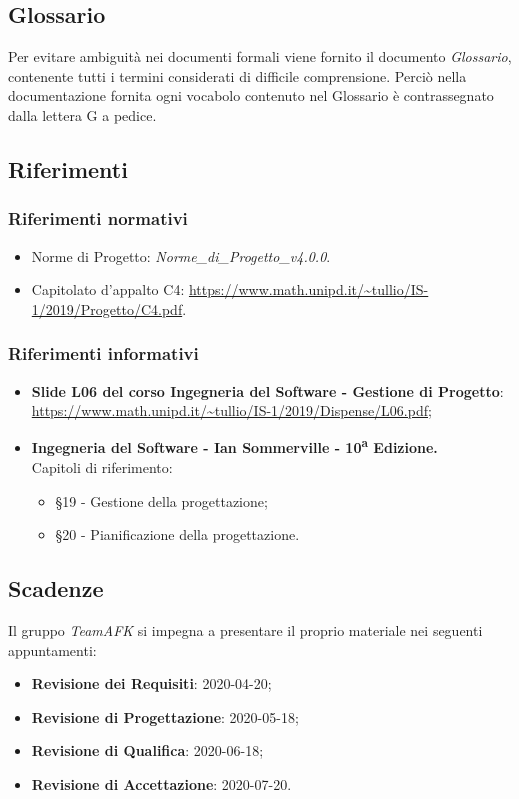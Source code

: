 \subsection{Glossario}
Per evitare ambiguità nei documenti formali viene fornito il documento \textit{Glossario}, contenente tutti i termini considerati di difficile comprensione. Perciò nella documentazione fornita ogni vocabolo contenuto nel Glossario è contrassegnato dalla lettera G a pedice.

\subsection{Riferimenti}
\subsubsection{Riferimenti normativi}
\begin{itemize}
	\item Norme di Progetto: \textit{Norme\_di\_Progetto\_v4.0.0}.
	\item Capitolato d'appalto C4: \url{https://www.math.unipd.it/~tullio/IS-1/2019/Progetto/C4.pdf}.
\end{itemize}
\subsubsection{Riferimenti informativi}
\begin{itemize}
	\item \textbf{Slide L06 del corso Ingegneria del Software - Gestione di Progetto}: \\
	\url{https://www.math.unipd.it/~tullio/IS-1/2019/Dispense/L06.pdf};
	\item \textbf{Ingegneria del Software - Ian Sommerville - 10\textsuperscript{a} Edizione.}\\
	Capitoli di riferimento: \begin{itemize}
	\item \S 19 - Gestione della progettazione;
	\item \S 20 - Pianificazione della progettazione.
	\end{itemize}
\end{itemize}
\subsection{Scadenze}
Il gruppo \textit{TeamAFK} si impegna a presentare il proprio materiale nei seguenti appuntamenti:\\
\begin{itemize}
\item \textbf{Revisione dei Requisiti}: 2020-04-20;
\item \textbf{Revisione di Progettazione}: 2020-05-18;
\item \textbf{Revisione di Qualifica}: 2020-06-18;
\item \textbf{Revisione di Accettazione}: 2020-07-20. 
\end{itemize}
